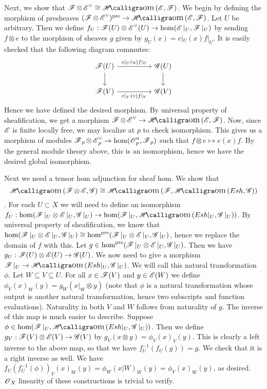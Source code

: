 \documentclass{article}
\begin{document}
Next, we show that $\Fsh \otimes \Esh^\vee \cong \Hom(\Esh, \Fsh)$. We begin by defining the morphism
of presheaves $(\Fsh \otimes \Esh^\vee)^\text{pre} \to \Hom(\Esh, \Fsh)$. Let $U$ be
arbitrary. Then we define $f_U: \operatorname{\mathscr{F}}(U) \otimes \operatorname{\mathscr{E}}^\vee(U) \to
    \hom(\operatorname{\mathscr{E}}|_U, \operatorname{\mathscr{F}}|_U)$ by sending
$f \otimes e$ to the morphism of sheaves $g$
given by $g_U(x)=e|_U(x)f|_U$. It is easily checked that the following
diagram commutes: \[\begin{tikzcd}
        {\mathscr{F}(U)} &  & {\mathscr{G}(U)} \\{\mathscr{F}(V)} &  & {\mathscr{G}(V)}
        \arrow["{e|_U(u)f|_U}", from=1-1, to=1-3]
        \arrow[from=1-3, to=2-3]
        \arrow[from=1-1, to=2-1]
        \arrow["{e|_V(v)f|_V}"', from=2-1, to=2-3]
    \end{tikzcd}\] Hence we have defined the desired
morphism. By universal property of sheafification, we get a morphism
$\Fsh \otimes \Esh^\vee \to \Hom(\Esh, \Fsh)$. Now, since $\operatorname{\mathscr{E}}$ is finite locally
free, we may localize at $p$ to check isomorphism. This
gives us a morphism of modules $\operatorname{\mathscr{F}}_p \otimes \operatorname{\mathscr{E}}^\vee_p \to \hom(\operatorname{\mathscr{O}}_p^n, \operatorname{\mathscr{F}}_p)$ such that
$f \otimes e \mapsto e(x)f$. By the general module theory above, this is an
isomorphism, hence we have the desired global isomorphism.

Next we need a tensor hom adjunction for sheaf hom. We show that
\[\Hom(\Fsh \otimes \Esh, \Gsh) \cong \Hom(\Fsh, \Hom(Esh, \Gsh))\]. For each $U \subset X$ we will need to
define an isomorphism $f_U: \hom(\Fsh|_U \otimes \Esh|_U, \Gsh|_U) \to \hom(\Fsh|_U, \Hom(Esh|_U, \Gsh|_U))$. By universal property of
sheafification, we know that $\hom(\operatorname{\mathscr{F}}|_U \otimes \operatorname{\mathscr{E}}|_U, \operatorname{\mathscr{G}}|_U) \cong \hom^\text{pre}(\operatorname{\mathscr{F}}|_U \otimes \operatorname{\mathscr{E}}|_U, \operatorname{\mathscr{G}}|_U)$, hence we replace the
domain of $f$ with this. Let $g \in \hom^\text{pre}(\operatorname{\mathscr{F}}|_U \otimes \operatorname{\mathscr{E}}|_U, \operatorname{\mathscr{G}}|_U)$. Then
we have $g_U: \operatorname{\mathscr{F}}(U) \otimes \operatorname{\mathscr{E}}(U) \to
    \operatorname{\mathscr{G}}(U)$. We now need to give a morphism
$\Fsh|_U \to \Hom(Esh|_U, \Gsh|_U)$. We will call this natural transformation
$\phi$. Let $W \subseteq V \subseteq U$. For all
$x \in \operatorname{\mathscr{F}}(V)$ and $y \in \operatorname{\mathscr{E}}(W)$ we define
$\phi_V(x)_W(y)=g_W(x|_W \otimes y)$ (note that $\phi$ is a natural
transformation whose output is another natural transformation, hence two
subscripts and function evaluations). Naturality in both
$V$ and $W$ follows from naturality of
$g$. The inverse of this map is much easier to describe.
Suppose $\phi \in \hom(\Fsh|_U, \Hom(Esh|_U, \Gsh|_U))$. Then we define $g_V: \operatorname{\mathscr{F}}(V) \otimes \operatorname{\mathscr{E}}(V) \to
    \operatorname{\mathscr{G}}(V)$ by
$g_V(x \otimes y)=\phi_V(x)_V(y)$. This is clearly a left inverse to the above map, so
that we have $f_U^{-1}(f_U(g))=g$. We check that it is a right inverse as
well. We have $f_U(f_U^{-1}(\phi))_V(x)_W(y)=\phi_W(x|W)_W(y)=\phi_V(x)_W(y)$, as desired. $\operatorname{\mathscr{O}}_X$
linearity of these constructions is trivial to verify.
\end{document}

